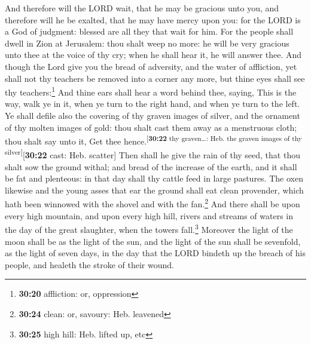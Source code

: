  And therefore will the LORD wait, that he may be
gracious unto you, and therefore will he be exalted, that he may have
mercy upon you: for the LORD is a God of judgment: blessed are all they
that wait for him.  For the people shall dwell in Zion at
Jerusalem: thou shalt weep no more: he will be very gracious unto thee
at the voice of thy cry; when he shall hear it, he will answer thee.
 And though the Lord give you the bread of adversity, and
the water of affliction, yet shall not thy teachers be removed into a
corner any more, but thine eyes shall see thy teachers:\footnote{\textbf{30:20}
  affliction: or, oppression}  And thine ears shall hear
a word behind thee, saying, This is the way, walk ye in it, when ye turn
to the right hand, and when ye turn to the left.  Ye
shall defile also the covering of thy graven images of silver, and the
ornament of thy molten images of gold: thou shalt cast them away as a
menstruous cloth; thou shalt say unto it, Get thee
hence.\textsuperscript{{[}\textbf{30:22} thy graven\ldots: Heb. the
graven images of thy silver{]}}{[}\textbf{30:22} cast: Heb. scatter{]}
 Then shall he give the rain of thy seed, that thou shalt
sow the ground withal; and bread of the increase of the earth, and it
shall be fat and plenteous: in that day shall thy cattle feed in large
pastures.  The oxen likewise and the young asses that ear
the ground shall eat clean provender, which hath been winnowed with the
shovel and with the fan.\footnote{\textbf{30:24} clean: or, savoury:
  Heb. leavened}  And there shall be upon every high
mountain, and upon every high hill, rivers and streams of waters in the
day of the great slaughter, when the towers fall.\footnote{\textbf{30:25}
  high hill: Heb. lifted up, etc}  Moreover the light of
the moon shall be as the light of the sun, and the light of the sun
shall be sevenfold, as the light of seven days, in the day that the LORD
bindeth up the breach of his people, and healeth the stroke of their
wound.

